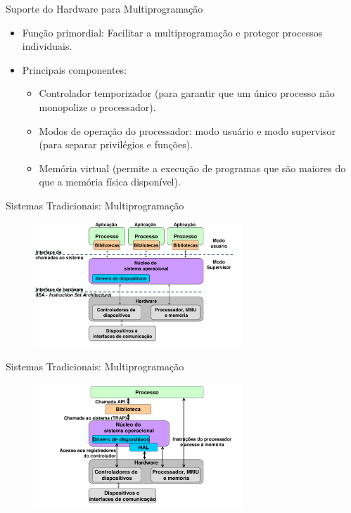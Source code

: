 \documentclass{beamer}
\begin{document}
    \begin{frame}{Suporte do Hardware para Multiprogramação}
    \begin{itemize}
        \item Função primordial: Facilitar a multiprogramação e proteger processos individuais.
        \item Principais componentes:
        \begin{itemize}
            \item Controlador temporizador (para garantir que um único processo não monopolize o processador).
            \item Modos de operação do processador: modo usuário e modo supervisor (para separar privilégios e funções).
            \item Memória virtual (permite a execução de programas que são maiores do que a memória física disponível).
        \end{itemize}
    \end{itemize}
    \end{frame}
    \begin{frame}[fragile]{Sistemas Tradicionais: Multiprogramação}

        \begin{figure}[H]
            \centerline{\includegraphics[width=0.7\textwidth]{assets/aula-tads-sope/aula-03-01.png}}
    
        \end{figure}
    \end{frame}
    \begin{frame}[fragile]{Sistemas Tradicionais: Multiprogramação}

        \begin{figure}[H]
            \centerline{\includegraphics[width=0.7\textwidth]{assets/aula-tads-sope/aula-03-02.png}}
    
        \end{figure}
    \end{frame}
    
\end{document}

